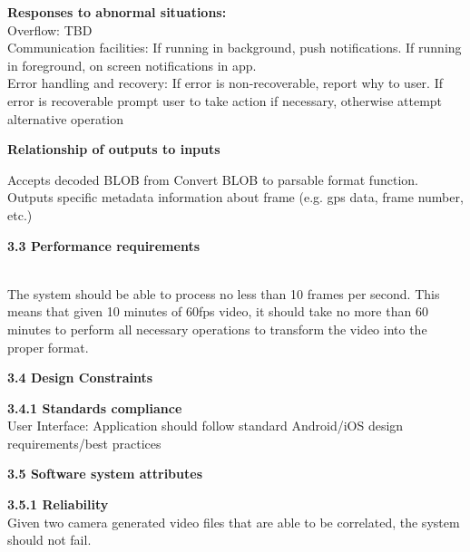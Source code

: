 \documentclass[10pt,draftclsnofoot,onecolumn]{IEEEtran}
\begin{document}
 \vspace{2mm}

\textbf{Responses to abnormal situations:}\\
 \vspace{2mm}
 Overflow: TBD\\
 Communication facilities: If running in background, push notifications. If running in foreground, on screen notifications in app. \\
 Error handling and recovery: If error is non-recoverable, report why to user. If error is recoverable prompt user to take action if necessary, otherwise attempt alternative operation

 \vspace{2mm}
\textbf{Relationship of outputs to inputs }\\
 \vspace{2mm}

Accepts decoded BLOB from Convert BLOB to parsable format function. Outputs specific metadata information about frame (e.g. gps data, frame number, etc.)
 \\\vspace{5mm}
 
 
 {\Medium\textbf{3.3 Performance requirements}} \\
  \\\vspace{5mm}

The system should be able to process no less than 10 frames per second. This means that given 10 minutes of 60fps video, it should take no more than 60 minutes to perform all necessary operations to transform the video into the proper format.
  \\\vspace{5mm}

 {\Medium\textbf{3.4 Design Constraints}} \\
   \vspace{5mm}

 {\Medium\textbf{3.4.1 Standards compliance}} \\
   \vspace{5mm}
   User Interface: Application should follow standard Android/iOS design requirements/best practices
   \vspace{5mm}

 {\Medium\textbf{3.5 Software system attributes}} \\
    \vspace{5mm}

 {\Medium\textbf{3.5.1 Reliability}} \\
Given two camera generated video files that are able to be correlated, the system should not fail.\\
 \vspace{2mm}
\end{document}
